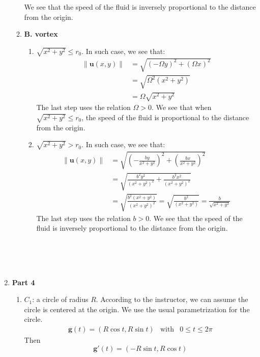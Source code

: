 \documentclass{article}
\begin{document}
\begin{enumerate}
\begin{enumerate}
    We see that the speed of the fluid is inversely proportional to the distance from the origin.\\
    \item \textbf{B. vortex}
    \begin{enumerate}
      \item \(\sqrt{x^2+y^2} \le r_0\). In such case, we see that:
      \begin{align*}
        \|\mathbf{u}(x,y)\|
        &= \sqrt{(-\Omega y)^2 + (\Omega x)^2}\\
        &= \sqrt{\Omega^2 (x^2+y^2)}\\
        &=\Omega \sqrt{x^2+y^2}
      \end{align*}
      The last step uses the relation \(\Omega>0\).
      We see that when \(\sqrt{x^2+y^2} \le r_0\), the speed of the fluid is proportional to the distance from the origin.\\
      \item \(\sqrt{x^2+y^2} > r_0\). In such case, we see that:
      \begin{align*}
        \|\mathbf{u}(x,y)\|
        &= \sqrt{\left(-\frac{by}{x^2+y^2}\right)^2 + \left(\frac{bx}{x^2+y^2}\right)^2}\\
        &= \sqrt{\frac{b^2y^2}{(x^2+y^2)^2} + \frac{b^2 x^2}{(x^2+y^2)^2}}\\
        &= \sqrt{\frac{b^2(x^2+y^2)}{(x^2+y^2)^2}} = \sqrt{\frac{b^2}{(x^2+y^2)}} = \frac{b}{\sqrt{x^2+y^2}}
      \end{align*}
      The last step uses the relation \(b>0\).
      We see that the speed of the fluid is inversely proportional to the distance from the origin.\\
    \end{enumerate}
  \end{enumerate}\text{ }\\
\pagebreak \\ \\
\item \textbf{Part 4}
\begin{enumerate}
  \item \(C_1\): a circle of radius \(R\). According to the instructor, we can assume the circle is centered at the origin.
   We use the usual parametrization for the circle.
  \begin{eqnarray}
    \mathbf{g}(t) = (R\cos t, R\sin t) & \text{with} & 0\le t \le 2\pi
  \end{eqnarray}
  Then
  \begin{equation}
    \mathbf{g}'(t) = (-R\sin t, R\cos t)

\end{equation}
\end{enumerate}
\end{enumerate}
\end{document}
